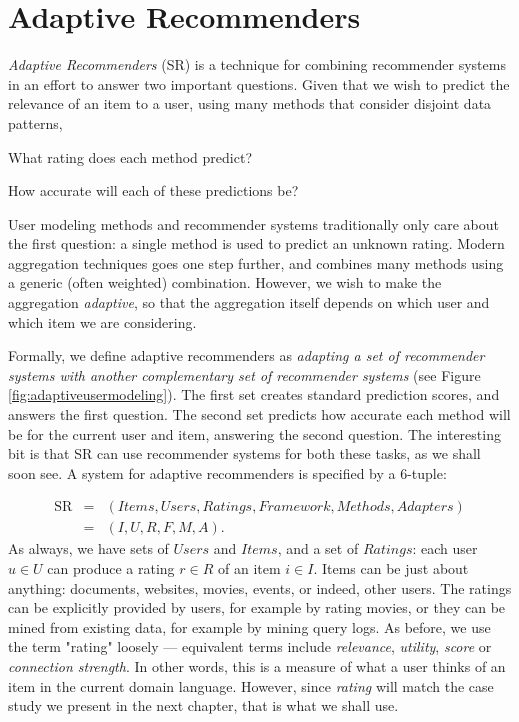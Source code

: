 \section{Adaptive Recommenders}
\label{sec:usermetamodeling}

\emph{Adaptive Recommenders} (SR) is a technique for combining recommender systems
in an effort to answer two important questions.
Given that we wish to predict the relevance of an item to a user,
using many methods that consider disjoint data patterns,

\begin{enumerate*}
  \item What rating does each method predict?
  \item How accurate will each of these predictions be?
\end{enumerate*}

User modeling methods and recommender systems traditionally only care about the first question:
a single method is used to predict an unknown rating.
Modern aggregation techniques goes one step further, and combines many methods using a generic (often weighted) combination.
However, we wish to make the aggregation \emph{adaptive},
so that the aggregation itself depends on which user and which item we are considering.

Formally, we define adaptive recommenders as \emph{adapting a set of recommender systems
with another complementary set of recommender systems} 
(see Figure \ref{fig:adaptiveusermodeling}).
The first set creates standard prediction scores, and answers the first question.
The second set predicts how accurate each method will be for the current user and item,
answering the second question.
The interesting bit is that SR can use recommender systems for both these tasks, as we shall soon see.
A system for adaptive recommenders is specified by a 6-tuple:

\begin{eqnarray*}
  \mathrm{SR} &=& (Items, Users, Ratings, Framework, Methods, Adapters)\\
              &=& (I,U,R,F,M,A).
\end{eqnarray*}
%
As always, we have sets of $Users$ and $Items$, 
and a set of $Ratings$: each user $u \in U$ can produce a rating $r \in R$ of an item $i \in I$.
Items can be just about anything: documents, websites, movies, events, or indeed, other users.
The ratings can be explicitly provided by users, for example by rating movies,
or they can be mined from existing data, for example by mining query logs.
As before, we use the term "rating" loosely --- equivalent terms include \emph{relevance}, \emph{utility},
\emph{score} or \emph{connection strength}. In other words, this is a measure of what a user thinks of an item
in the current domain language. However, since \emph{rating} will match the case study we present in the next chapter,
that is what we shall use. 

